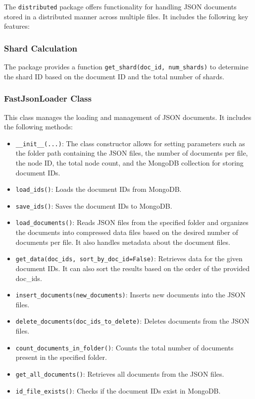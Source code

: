 \documentclass{article}
\begin{document}
The \texttt{distributed} package offers functionality for handling JSON documents stored in a 
distributed manner across multiple files. It includes the following key features:

\subsubsection{Shard Calculation}
The package provides a function \texttt{get\_shard(doc\_id, num\_shards)} to determine the shard 
ID based on the document ID and the total number of shards.

\subsubsection{FastJsonLoader Class}
This class manages the loading and management of JSON documents. It includes the following 
methods:

\begin{itemize}
    \item \texttt{\_\_init\_\_(...)}: The class constructor allows for setting parameters such 
    as the folder path containing the JSON files, the number of documents per file, the node ID, 
    the total node count, and the MongoDB collection for storing document IDs.
    
    \item \texttt{load\_ids()}: Loads the document IDs from MongoDB.
    
    \item \texttt{save\_ids()}: Saves the document IDs to MongoDB.
    
    \item \texttt{load\_documents()}: Reads JSON files from the specified folder and organizes 
    the documents into compressed data files based on the desired number of documents per file. 
    It also handles metadata about the document files.
    
    \item \texttt{get\_data(doc\_ids, sort\_by\_doc\_id=False)}: Retrieves data for the given 
    document IDs. It can also sort the results based on the order of the provided doc\_ids.
    
    \item \texttt{insert\_documents(new\_documents)}: Inserts new documents into the JSON files.
    
    \item \texttt{delete\_documents(doc\_ids\_to\_delete)}: Deletes documents from the JSON 
    files.
    
    \item \texttt{count\_documents\_in\_folder()}: Counts the total number of documents present 
    in the specified folder.
    
    \item \texttt{get\_all\_documents()}: Retrieves all documents from the JSON files.
    
    \item \texttt{id\_file\_exists()}: Checks if the document IDs exist in MongoDB.
\end{itemize}
\end{document}
